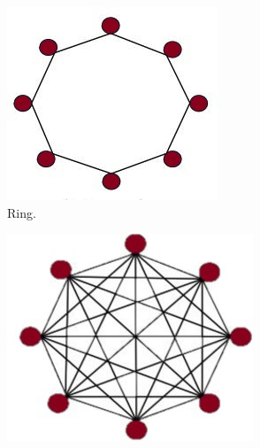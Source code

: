 \begin{figure}[H]\centering
  \begin{subfigure}[b]{0.23\textwidth}
\includegraphics[width=\textwidth]{"Part 2 - Search-Based Optimization/Particle Swarm Optimization/Images/RING.jpg"}
    \caption{Ring.}
    \label{fig:ringtopology}
  \end{subfigure}
 \hfill
  \begin{subfigure}[b]{0.23\textwidth}
    \includegraphics[width=\textwidth]{"Part 2 - Search-Based Optimization/Particle Swarm Optimization/Images/STAR.jpg"}

\end{subfigure}
\end{figure}
